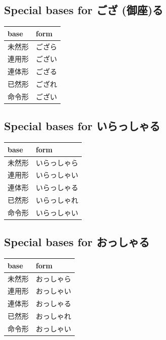 \documentclass[11pt, b5paper, twoside, openright, onecolumn]{book}
\makeatletter
\newcommand*{\rubystack}[2]{{\relscale{0.5}%
  \begin{tabular}[b]{@{}c@{}}%
    {#1}\\%
   {\textscale{2}{#2}}%
  \end{tabular}}%
}
\DeclareRobustCommand*{\ruby}[2]{%
  \mbox{%
    \setlength{\parskip}{0ex}%
    \BeginAccSupp{method=pdfstringdef,ActualText={#1}}%
      \rubystack{\phantom{#2}}{#1}%
      \llap{%
        \rubystack{#2}{\phantom{#1}}%
      }%
    \EndAccSupp{}%
  }%
}
\renewcommand*{\ruby}[2]{#2 (#1)}%
\newenvironment{mytabular}[1]{\noindent\hspace{0.4in}
\begin{tabular}[h]{#1}}{\end{tabular}}
\makeatother
\begin{document}
\subsection{Special bases for \ruby{御座}{ござ}る}

\smaller
\begin{mytabular}{| l  l |}\hline 
\rule{0pt}{2.4ex}base & form\\ 
\hline
\rule{0pt}{2.4ex}未然形 & ござら\\ 
\rule{0pt}{2.4ex}連用形 & ござい\\ 
\rule{0pt}{2.4ex}連体形 & ござる\\ 
\rule{0pt}{2.4ex}已然形 & ござれ\\ 
\rule{0pt}{2.4ex}命令形 & ござい\\ 
\hline 
\end{mytabular}
\larger

\subsection{Special bases for いらっしゃる}

\smaller
\begin{mytabular}{| l  l |}\hline 
\rule{0pt}{2.4ex}base & form\\ 
\hline
\rule{0pt}{2.4ex}未然形 & いらっしゃら\\ 
\rule{0pt}{2.4ex}連用形 & いらっしゃい\\ 
\rule{0pt}{2.4ex}連体形 & いらっしゃる\\ 
\rule{0pt}{2.4ex}已然形 & いらっしゃれ\\ 
\rule{0pt}{2.4ex}命令形 & いらっしゃい\\ 
\hline 
\end{mytabular}
\larger

\subsection{Special bases for おっしゃる}

\smaller
\begin{mytabular}{| l  l |}\hline 
\rule{0pt}{2.4ex}base & form\\ 
\hline
\rule{0pt}{2.4ex}未然形 & おっしゃら\\ 
\rule{0pt}{2.4ex}連用形 & おっしゃい\\ 
\rule{0pt}{2.4ex}連体形 & おっしゃる\\ 
\rule{0pt}{2.4ex}已然形 & おっしゃれ\\ 
\rule{0pt}{2.4ex}命令形 & おっしゃい\\ 
\hline 
\end{mytabular}
\larger
\end{document}
